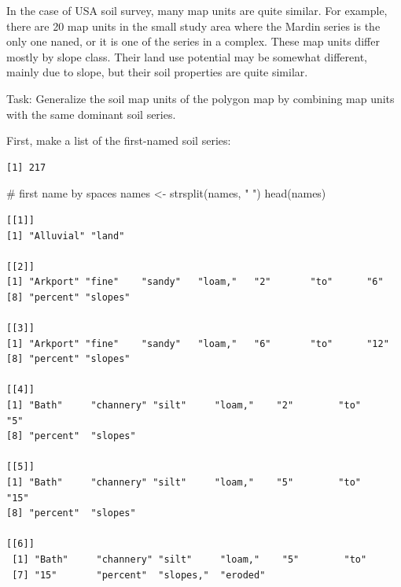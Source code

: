 \documentclass[
  letterpaper,
  DIV=11,
  numbers=noendperiod]{scrartcl}
\newenvironment{Shaded}{\begin{snugshade}}{\end{snugshade}}
\newcommand{\CommentTok}[1]{\textcolor[rgb]{0.37,0.37,0.37}{#1}}
\newcommand{\FunctionTok}[1]{\textcolor[rgb]{0.28,0.35,0.67}{#1}}
\newcommand{\NormalTok}[1]{\textcolor[rgb]{0.00,0.23,0.31}{#1}}
\newcommand{\OtherTok}[1]{\textcolor[rgb]{0.00,0.23,0.31}{#1}}
\newcommand{\SpecialCharTok}[1]{\textcolor[rgb]{0.37,0.37,0.37}{#1}}
\newcommand{\StringTok}[1]{\textcolor[rgb]{0.13,0.47,0.30}{#1}}
\begin{document}
In the case of USA soil survey, many map units are quite similar. For
example, there are 20 map units in the small study area where the Mardin
series is the only one naned, or it is one of the series in a complex.
These map units differ mostly by slope class. Their land use potential
may be somewhat different, mainly due to slope, but their soil
properties are quite similar.

Task: Generalize the soil map units of the polygon map by combining map
units with the same dominant soil series.

First, make a list of the first-named soil series:

\begin{Shaded}
\end{Shaded}

\begin{verbatim}
[1] 217
\end{verbatim}

\begin{Shaded}
\begin{Highlighting}[]
\CommentTok{\# first name by spaces}
\NormalTok{names }\OtherTok{\textless{}{-}} \FunctionTok{strsplit}\NormalTok{(names, }\StringTok{" "}\NormalTok{)}
\FunctionTok{head}\NormalTok{(names)}
\end{Highlighting}
\end{Shaded}

\begin{verbatim}
[[1]]
[1] "Alluvial" "land"    

[[2]]
[1] "Arkport" "fine"    "sandy"   "loam,"   "2"       "to"      "6"      
[8] "percent" "slopes" 

[[3]]
[1] "Arkport" "fine"    "sandy"   "loam,"   "6"       "to"      "12"     
[8] "percent" "slopes" 

[[4]]
[1] "Bath"     "channery" "silt"     "loam,"    "2"        "to"       "5"       
[8] "percent"  "slopes"  

[[5]]
[1] "Bath"     "channery" "silt"     "loam,"    "5"        "to"       "15"      
[8] "percent"  "slopes"  

[[6]]
 [1] "Bath"     "channery" "silt"     "loam,"    "5"        "to"      
 [7] "15"       "percent"  "slopes,"  "eroded"  
\end{verbatim}
\end{document}
